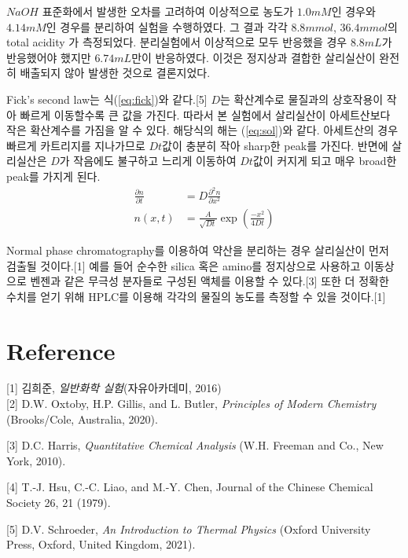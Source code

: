 \documentclass[%
 reprint,
 amsmath,amssymb,
 aps,
]{revtex4-2}
\begin{document}
$NaOH$ 표준화에서 발생한 오차를 고려하여 이상적으로 농도가 $1.0mM$인 경우와 $4.14mM$인 경우를 분리하여 실험을 수행하였다. 그 결과 각각 $8.8mmol$, $36.4mmol$의 total acidity 가 측정되었다. 분리실험에서 이상적으로 모두 반응했을 경우 $8.8mL$가 반응했어야 했지만 $6.74mL$만이 반응하였다. 이것은 정지상과 결합한 살리실산이 완전히 배출되지 않아 발생한 것으로 결론지었다.

Fick's second law는 식(\ref{eq:fick})와 같다.[5] $D$는 확산계수로 물질과의 상호작용이 작아 빠르게 이동할수록 큰 값을 가진다. 따라서 본 실험에서 살리실산이 아세트산보다 작은 확산계수를 가짐을 알 수 있다. 해당식의 해는 (\ref{eq:sol})와 같다. 아세트산의 경우 빠르게 카트리지를 지나가므로 $Dt$값이 충분히 작아 sharp한 peak를 가진다. 반면에 살리실산은 $D$가 작음에도 불구하고 느리게 이동하여 $Dt$값이 커지게 되고 매우 broad한 peak를 가지게 된다.
\begin{align} 
	\frac{\partial n}{\partial t} &= D\frac{\partial^{2} n}{\partial x^{2}}\label{eq:fick}\\
	n(x,t) &= \frac{A}{\sqrt{Dt}}\exp\left(\frac{-x^{2}}{4Dt}\right)\label{eq:sol}
\end{align}

Normal phase chromatography를 이용하여 약산을 분리하는 경우 살리실산이 먼저 검출될 것이다.[1] 예를 들어 순수한 silica 혹은 amino를 정지상으로 사용하고 이동상으로 벤젠과 같은 무극성 분자들로 구성된 액체를 이용할 수 있다.[3] 또한 더 정확한 수치를 얻기 위해 HPLC를 이용해 각각의 물질의 농도를 측정할 수 있을 것이다.[1]



\section{\label{sec:level1}Reference}
[1] 김희준, \textit{일반화학 실험}(자유아카데미, 2016)\\

[2] D.W. Oxtoby, H.P. Gillis, and L. Butler, \textit{Principles of Modern Chemistry} (Brooks/Cole, Australia, 2020).

[3] D.C. Harris, \textit{Quantitative Chemical Analysis} (W.H. Freeman and Co., New York, 2010). 

[4] T.-J. Hsu, C.-C. Liao, and M.-Y. Chen, Journal of the Chinese Chemical Society 26, 21 (1979). 

[5] D.V. Schroeder, \textit{An Introduction to Thermal Physics} (Oxford University Press, Oxford, United Kingdom, 2021). 
\end{document}
